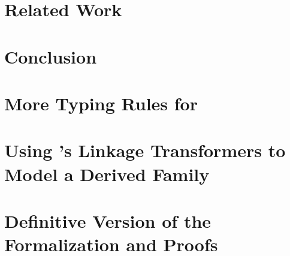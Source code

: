 \section{Related Work}\label{sec:related-work}


\section{Conclusion}
\label{sec:conclusion}



\setlength{\bibsep}{.8ex}



\ifreport

\appendix

\newpage

\section{More Typing Rules for \TT}
\label{sec:more-rules}


\newpage

\section{Using \TT's Linkage Transformers to Model a Derived Family}
\label{sec:lt-in-action}


\newpage

\section{Definitive Version of the Formalization and Proofs}
\label{sec:agda-files}


%
%
%

\fi